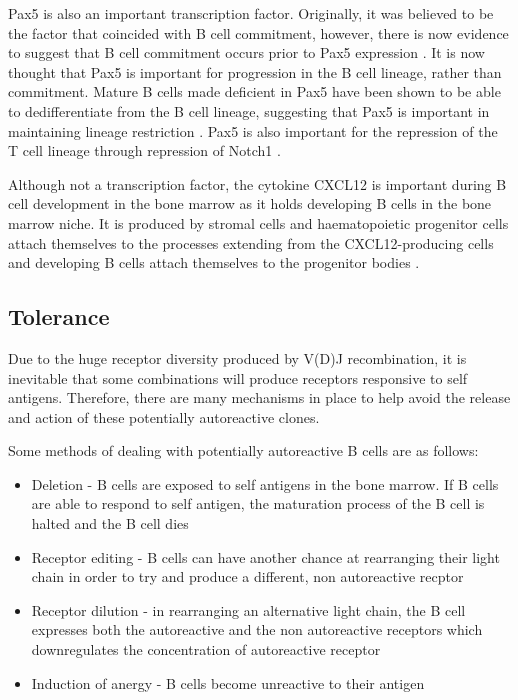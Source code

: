 Pax5 is also an important transcription factor.
Originally, it was believed to be the factor that coincided with B cell commitment, however, there is now evidence to suggest that B cell commitment occurs prior to Pax5 expression \citep{Welinder2011}.
It is now thought that Pax5 is important for progression in the B cell lineage, rather than commitment.
Mature B cells made deficient in Pax5 have been shown to be able to dedifferentiate from the B cell lineage, suggesting that Pax5 is important in maintaining lineage restriction \citep{Cobaleda2007}.
Pax5 is also important for the repression of the T cell lineage through repression of Notch1 \citep{Souabni2002}.

Although not a transcription factor, the cytokine CXCL12 is important during B cell development in the bone marrow as it holds developing B cells in the bone marrow niche.
It is produced by stromal cells and haematopoietic progenitor cells attach themselves to the processes extending from the CXCL12-producing cells and developing B cells attach themselves to the progenitor bodies \citep{Tokoyoda2004}.

\subsection{Tolerance}

Due to the huge receptor diversity produced by V(D)J recombination, it is inevitable that some combinations will produce receptors responsive to self antigens.
Therefore, there are many mechanisms in place to help avoid the release and action of these potentially autoreactive clones.

Some methods of dealing with potentially autoreactive B cells are as follows:
\begin{itemize}
\item Deletion - B cells are exposed to self antigens in the bone marrow. If B cells are able to respond to self antigen, the maturation process of the B cell is halted and the B cell dies \citep{Cornall1995}
\item Receptor editing - B cells can have another chance at rearranging their light chain in order to try and produce a different, non autoreactive recptor \citep{Orduno2009, Gay1993}
\item Receptor dilution - in rearranging an alternative light chain, the B cell expresses both the autoreactive and the non autoreactive receptors which downregulates the concentration of autoreactive receptor \citep{Gay1993, Orduno2009}
\item Induction of anergy - B cells become unreactive to their antigen \citep{Orduno2009}
\end{itemize}


